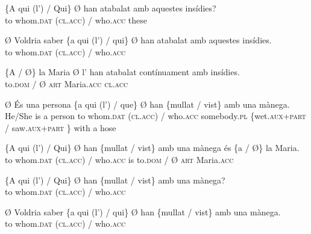 \documentclass[output=paper,colorlinks,citecolor=brown,modfonts,nonflat]{langsci/langscibook}
\begin{document}
	 
 
 \ex \label{ex:royo:16c}
 \gll \{A qui (l’) / Qui\} Ø han atabalat amb aquestes insídies?\\
to whom.\textsc{dat} (\textsc{cl.acc}) / who.\textsc{acc} these    \\
\glt {}
 
 \ex \label{ex:royo:16d}
 \gll Ø Voldria saber \{a qui (l’) / qui\} Ø han atabalat amb aquestes insídies.\\
 to whom.\textsc{dat} (\textsc{cl.acc}) / who.\textsc{acc}   \\
\glt {}
 
\ex \label{ex:royo:16e}
 \gll \{A / Ø\} la Maria Ø l’ han atabalat contínuament amb insídies.\\
 to.\textsc{dom} / Ø \textsc{art} Maria.\textsc{acc} \textsc{cl.acc} \\
\glt {}
 
 \z
 \z


\ea%
 \label{ex:royo:17}
 \ea \label{ex:royo:17a}
 \gll Ø És una persona \{a qui (l’) / que\} Ø han \{mullat / vist\} amb una mànega.\\
He/She is a person to whom.\textsc{dat} (\textsc{cl.acc}) / who.\textsc{acc} somebody.\textsc{pl} \{wet.\textsc{aux}+\textsc{part} / saw.\textsc{aux}+\textsc{part} \} with a hose \\
\glt {}
 
 \ex \label{ex:royo:17b}
 \gll \{A qui (l’) / Qui\} Ø han \{mullat / vist\} amb una mànega és \{a / Ø\} la Maria.\\
 to whom.\textsc{dat} (\textsc{cl.acc}) / who.\textsc{acc} is to.\textsc{dom} / Ø \textsc{art} Maria.\textsc{acc}\\
\glt {}
 
 \ex \label{ex:royo:17c}
 \gll \{A qui (l’) / Qui\} Ø han \{mullat / vist\} amb una mànega?\\
 to whom.\textsc{dat} (\textsc{cl.acc}) / who.\textsc{acc} \\
\glt {}
 
 \ex \label{ex:royo:17d}
 \gll Ø Voldria saber \{a qui (l’) / qui\} Ø han \{mullat / vist\} amb una mànega.\\
 to whom.\textsc{dat} (\textsc{cl.acc}) / who.\textsc{acc} \\
\glt {}
 
\end{document}
